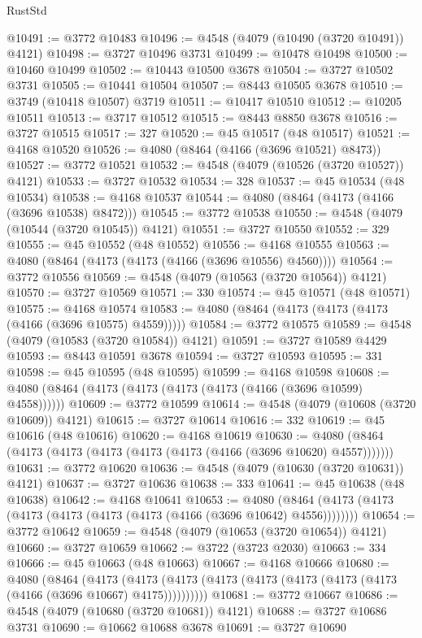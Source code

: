 \begin{lexlean}{RustStd}
\begin{coremodule}
@10491 := @3772 @10483
@10496 := @4548 (@4079 (@10490 (@3720 @10491)) @4121)
@10498 := @3727 @10496 @3731
@10499 := @10478 @10498
@10500 := @10460 @10499
@10502 := @10443 @10500 @3678
@10504 := @3727 @10502 @3731
@10505 := @10441 @10504
@10507 := @8443 @10505 @3678
@10510 := @3749 (@10418 @10507) @3719
@10511 := @10417 @10510
@10512 := @10205 @10511
@10513 := @3717 @10512
@10515 := @8443 @8850 @3678
@10516 := @3727 @10515
@10517 := 327
@10520 := @45 @10517 (@48 @10517)
@10521 := @4168 @10520
@10526 := @4080 (@8464 (@4166 (@3696 @10521) @8473))
@10527 := @3772 @10521
@10532 := @4548 (@4079 (@10526 (@3720 @10527)) @4121)
@10533 := @3727 @10532
@10534 := 328
@10537 := @45 @10534 (@48 @10534)
@10538 := @4168 @10537
@10544 := @4080 (@8464 (@4173 (@4166 (@3696 @10538) @8472)))
@10545 := @3772 @10538
@10550 := @4548 (@4079 (@10544 (@3720 @10545)) @4121)
@10551 := @3727 @10550
@10552 := 329
@10555 := @45 @10552 (@48 @10552)
@10556 := @4168 @10555
@10563 := @4080 (@8464 (@4173 (@4173 (@4166 (@3696 @10556) @4560))))
@10564 := @3772 @10556
@10569 := @4548 (@4079 (@10563 (@3720 @10564)) @4121)
@10570 := @3727 @10569
@10571 := 330
@10574 := @45 @10571 (@48 @10571)
@10575 := @4168 @10574
@10583 := @4080 (@8464 (@4173 (@4173 (@4173 (@4166 (@3696 @10575) @4559)))))
@10584 := @3772 @10575
@10589 := @4548 (@4079 (@10583 (@3720 @10584)) @4121)
@10591 := @3727 @10589 @4429
@10593 := @8443 @10591 @3678
@10594 := @3727 @10593
@10595 := 331
@10598 := @45 @10595 (@48 @10595)
@10599 := @4168 @10598
@10608 := @4080 (@8464 (@4173 (@4173 (@4173 (@4173 (@4166 (@3696 @10599) @4558))))))
@10609 := @3772 @10599
@10614 := @4548 (@4079 (@10608 (@3720 @10609)) @4121)
@10615 := @3727 @10614
@10616 := 332
@10619 := @45 @10616 (@48 @10616)
@10620 := @4168 @10619
@10630 := @4080 (@8464 (@4173 (@4173 (@4173 (@4173 (@4173 (@4166 (@3696 @10620) @4557)))))))
@10631 := @3772 @10620
@10636 := @4548 (@4079 (@10630 (@3720 @10631)) @4121)
@10637 := @3727 @10636
@10638 := 333
@10641 := @45 @10638 (@48 @10638)
@10642 := @4168 @10641
@10653 := @4080 (@8464 (@4173 (@4173 (@4173 (@4173 (@4173 (@4173 (@4166 (@3696 @10642) @4556))))))))
@10654 := @3772 @10642
@10659 := @4548 (@4079 (@10653 (@3720 @10654)) @4121)
@10660 := @3727 @10659
@10662 := @3722 (@3723 @2030)
@10663 := 334
@10666 := @45 @10663 (@48 @10663)
@10667 := @4168 @10666
@10680 := @4080
    (@8464
      (@4173 (@4173 (@4173 (@4173 (@4173 (@4173 (@4173 (@4173 (@4166 (@3696 @10667) @4175))))))))))
@10681 := @3772 @10667
@10686 := @4548 (@4079 (@10680 (@3720 @10681)) @4121)
@10688 := @3727 @10686 @3731
@10690 := @10662 @10688 @3678
@10691 := @3727 @10690

\end{coremodule}
\end{lexlean}
